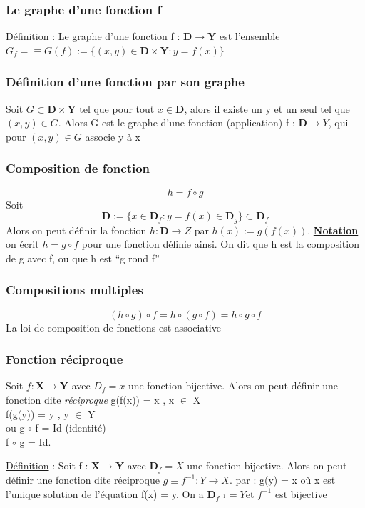 \documentclass[12pt,a4paper]{article}
\newcommand{\evid}[1]{\textbf{\underline{#1}}}
\newcommand{\Definition}{\underline{Définition} }
\begin{document}
\subsubsection{Le graphe d'une fonction f}
\begin{boite}
\Definition : Le graphe d'une fonction f : $\mathbf{\mathbf{D}} \to \mathbf{Y}$ est l'ensemble $G_f = \equiv G(f) := \{ (x,y) \in \mathbf{\mathbf{D}} \times \mathbf{Y} : y = f(x)\}$
\end{boite}

\subsubsection{Définition d'une fonction par son graphe}
Soit $G \subset \mathbf{\mathbf{D}} \times \mathbf{Y}$ tel que pour tout $x \in \mathbf{D}$, alors il existe un y et un seul tel que $(x,y) \in G$. Alors G est le graphe d'une fonction (application) f : $\mathbf{D} \to Y$, qui pour $(x,y) \in G$ associe y à x
\subsubsection{Composition de fonction}
\begin{equation}
h = f \circ g
\end{equation}
Soit\begin{equation}
\mathbf{D} := \{x \in \mathbf{D}_f : y = f(x) \in \mathbf{D}_g\} \subset \mathbf{D}_f
\end{equation} 
Alors on peut définir la fonction $h : \mathbf{D} \to Z$ par $h(x) := g(f(x))$.
\evid{Notation} on écrit  $h = g \circ f$ pour une fonction définie ainsi. On dit que h est la composition de g avec f, ou que h est ``g rond f''
\subsubsection{Compositions multiples}
\begin{equation}
(h \circ g) \circ f = h\circ (g \circ f) = h \circ g \circ f
\end{equation}
La loi de composition de fonctions est associative
\subsubsection{Fonction réciproque}
Soit $f: \mathbf{X} \to \mathbf{Y}$ avec $D_f = x$ une fonction bijective. Alors on peut définir une fonction dite \textit{réciproque}
g(f(x)) = x , x $\in$ X\\
f(g(y)) = y , y $\in$ Y\\
ou g $\circ$ f = Id (identité)\\
f $\circ$ g = Id.\\
\begin{boite}
\Definition : Soit f : $\mathbf{X} \to \mathbf{Y}$ avec $\mathbf{D}_f = X$ une fonction bijective. Alors on peut définir une fonction dite réciproque $g\equiv f^{-1} : Y \to X$. par : g(y) = x   où x est l'unique solution de l'équation f(x) = y. On a $\mathbf{D}_{f^{-1}} = Y$et $f^{-1}$ est bijective
\end{boite}
\end{document}
